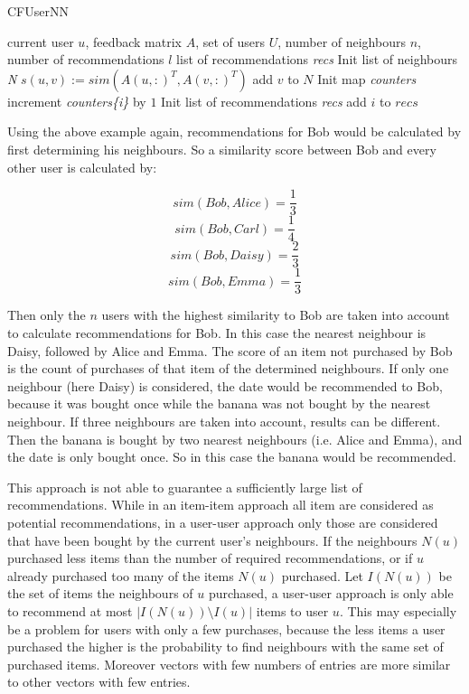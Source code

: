 \documentclass[10pt]{reportMaster}
\begin{document}
\begin{algorithm}
	\caption[CFUserNN]{CFUserNN}
	\label{alg:CFUserNN}
	\begin{algorithmic}[1]
		\Require current user $u$, feedback matrix $A$, set of users $U$, number of neighbours $n$, number of recommendations $l$
		\Ensure list of recommendations \textit{recs}
		\State Init list of neighbours \textit{N}
			\State $s(u,v) := sim(A(u,:)^T, A(v,:)^T)$
				\State add $v$ to $N$
			\EndIf
		\EndFor
		\State Init map \textit{counters}
				\State increment \textit{counters\{i\}} by $1$
			\EndFor
		\EndFor
		\State Init list of recommendations \textit{recs}
			\State add $i$ to $recs$
			\EndIf
		\EndFor
	\end{algorithmic}	
\end{algorithm}

Using the above example again, recommendations for Bob would be calculated by first determining his neighbours.
So a similarity score between Bob and every other user is calculated by: 

$$sim(Bob, Alice) = \frac{1}{3}$$
$$sim(Bob, Carl) = \frac{1}{4}$$
$$sim(Bob, Daisy) = \frac{2}{3}$$
$$sim(Bob, Emma) = \frac{1}{3}$$

Then only the $n$ users with the highest similarity to Bob are taken into account to calculate recommendations for Bob.
In this case the nearest neighbour is Daisy, followed by Alice and Emma.
The score of an item not purchased by Bob is the count of purchases of that item of the determined neighbours.
If only one neighbour (here Daisy) is considered, the date would be recommended to Bob, because it was bought once while the banana was not bought by the nearest neighbour.
If three neighbours are taken into account, results can be different.
Then the banana is bought by two nearest neighbours (i.e. Alice and Emma), and the date is only bought once.
So in this case the banana would be recommended.

This approach is not able to guarantee a sufficiently large list of recommendations.
While in an item-item approach all item are considered as potential recommendations, in a user-user approach only those are considered that have been bought by the current user's neighbours.
If the neighbours $N(u)$ purchased less items than the number of required recommendations, or if $u$ already purchased too many of the items $N(u)$ purchased.
Let $I(N(u))$ be the set of items the neighbours of $u$ purchased, a user-user approach is only able to recommend at most $|I(N(u)) \setminus I(u)|$ items to user $u$.
This may especially be a problem for users with only a few purchases, because the less items a user purchased the higher is the probability to find neighbours with the same set of purchased items.
Moreover vectors with few numbers of entries are more similar to other vectors with few entries.
\end{document}
